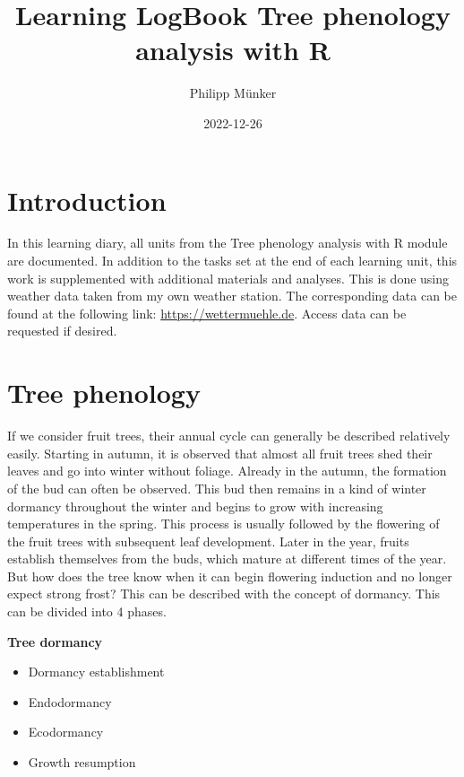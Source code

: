 \documentclass[
]{book}
\title{Learning LogBook Tree phenology analysis with R}
\author{Philipp Münker}
\date{2022-12-26}
\providecommand{\tightlist}{%
  \setlength{\itemsep}{0pt}\setlength{\parskip}{0pt}}
\begin{document}
\maketitle

{
\setcounter{tocdepth}{1}
\tableofcontents
}
\hypertarget{introduction}{%
\chapter{Introduction}\label{introduction}}

In this learning diary, all units from the Tree phenology analysis with R module are documented. In addition to the tasks set at the end of each learning unit, this work is supplemented with additional materials and analyses. This is done using weather data taken from my own weather station. The corresponding data can be found at the following link: \url{https://wettermuehle.de}. Access data can be requested if desired.

\hypertarget{tree-phenology}{%
\chapter{Tree phenology}\label{tree-phenology}}

If we consider fruit trees, their annual cycle can generally be described relatively easily. Starting in autumn, it is observed that almost all fruit trees shed their leaves and go into winter without foliage. Already in the autumn, the formation of the bud can often be observed. This bud then remains in a kind of winter dormancy throughout the winter and begins to grow with increasing temperatures in the spring. This process is usually followed by the flowering of the fruit trees with subsequent leaf development. Later in the year, fruits establish themselves from the buds, which mature at different times of the year.
But how does the tree know when it can begin flowering induction and no longer expect strong frost?
This can be described with the concept of dormancy. This can be divided into 4 phases.

\textbf{Tree dormancy}

\begin{itemize}
\tightlist
\item
  Dormancy establishment
\item
  Endodormancy
\item
  Ecodormancy
\item
  Growth resumption
\end{itemize}
\end{document}
